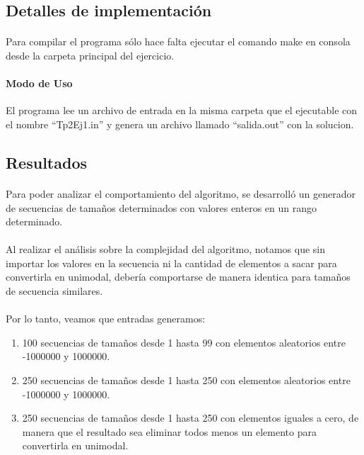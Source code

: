 \subsection{Detalles de implementación}

\paragraph{}
Para compilar el programa sólo hace falta ejecutar el comando make en consola desde la carpeta principal del ejercicio.

\paragraph{Modo de Uso}
El programa lee un archivo de entrada en la misma carpeta que el ejecutable con el nombre ``Tp2Ej1.in'' y genera un archivo llamado ``salida.out'' con la solucion.

\clearpage

\subsection{Resultados}
\label{resultadosej1}

\paragraph{}
Para poder analizar el comportamiento del algoritmo, se desarrolló un generador de secuencias de tamaños determinados con valores enteros en un rango determinado.

\paragraph{}
Al realizar el análisis sobre la complejidad del algoritmo, notamos que sin importar los valores en la secuencia ni la cantidad de elementos a sacar para convertirla en unimodal, debería comportarse de manera identica para tamaños de secuencia similares.

\paragraph{}
Por lo tanto, veamos que entradas generamos:
\begin{enumerate}
  \item 100 secuencias de tamaños desde 1 hasta 99 con elementos aleatorios entre -1000000 y 1000000.
  \item 250 secuencias de tamaños desde 1 hasta 250 con elementos aleatorios entre -1000000 y 1000000.
  \item 250 secuencias de tamaños desde 1 hasta 250 con elementos iguales a cero, de manera que el resultado sea eliminar todos menos un elemento para convertirla en unimodal.
\end{enumerate}



